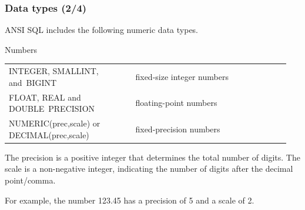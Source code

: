 \documentclass[english,serif,mathserif]{beamer}
\begin{document}
\begin{frame}[fragile]
  \frametitle{Data types (2/4)}
  \smaller

  ANSI SQL includes the following numeric data types.

  \begin{describe}{Numbers}
    \begin{tabular}{>{\ttfamily\flushright}p{0.45\linewidth}>{\flushleft}p{0.5\linewidth}l}
      INTEGER, SMALLINT, \textnormal{and}~BIGINT & fixed-size integer numbers &\\
      FLOAT, REAL \textnormal{and} DOUBLE~PRECISION & floating-point numbers &\\
      NUMERIC(prec,scale) \textnormal{or} DECIMAL(prec,scale)
                                                 & fixed-precision numbers
                                                                              &\\
    \end{tabular}
  \end{describe}

  \+\smaller
  The precision is a positive integer that determines the total number of
  digits. The scale is a non-negative integer, indicating the number of digits
  after the decimal point/comma.

  \+
  For example, the number 123.45 has a precision of 5 and a scale of 2.


\end{frame}
\end{document}
